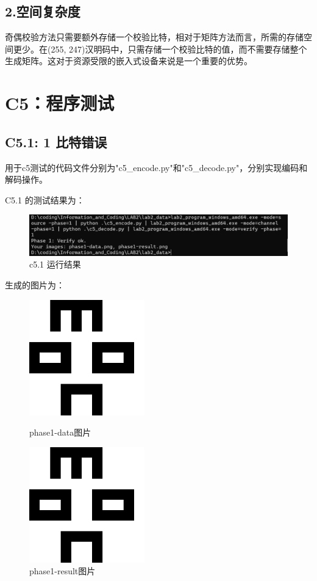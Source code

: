 \documentclass[12pt, a4paper]{ctexart}
\begin{document}
\subsection*{2.空间复杂度}

奇偶校验方法只需要额外存储一个校验比特，相对于矩阵方法而言，所需的存储空间更少。在(255, 247)汉明码中，只需存储一个校验比特的值，而不需要存储整个生成矩阵。这对于资源受限的嵌入式设备来说是一个重要的优势。


\section*{C5：程序测试}
    \subsection*{C5.1: 1 比特错误}
    
    用于c5测试的代码文件分别为"c5\_encode.py"和"c5\_decode.py"，分别实现编码和解码操作。
    
    C5.1 的测试结果为：
    \begin{figure}[H]
        \centering
        \includegraphics[width=12cm]{./pic/3-1.png}		
        \caption{c5.1 运行结果}
    \end{figure}

    生成的图片为：
    \begin{figure}[H]
    \centering
    \begin{minipage}[t]{0.45\textwidth}
    \centering
    \includegraphics[width=5cm]{./pic/phase1-data.png}
    \caption{phase1-data图片}
    \end{minipage}
    \hfill
    \begin{minipage}[t]{0.45\textwidth}
    \centering
    \includegraphics[width=5cm]{./pic/phase1-result.png}
    \caption{phase1-result图片}
    \end{minipage}
    \end{figure}
\end{document}
